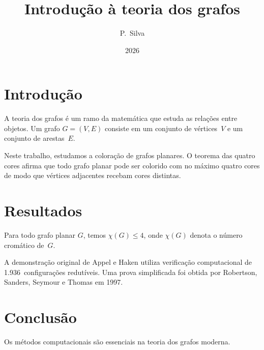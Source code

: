 \documentclass{article}
\title{Introdu\c{c}\~ao \`a teoria dos grafos}
\author{P.~Silva}
\date{2026}
\begin{document}
\maketitle

\section{Introdu\c{c}\~ao}

A teoria dos grafos \'e um ramo da matem\'atica que estuda as rela\c{c}\~oes
entre objetos.  Um grafo $G = (V, E)$ consiste em um conjunto de v\'ertices~$V$
e um conjunto de arestas~$E$.

Neste trabalho, estudamos a colora\c{c}\~ao de grafos planares.  O teorema das
quatro cores afirma que todo grafo planar pode ser colorido com no m\'aximo
quatro cores de modo que v\'ertices adjacentes recebam cores distintas.

\section{Resultados}

\begin{theorem}
Para todo grafo planar $G$, temos $\chi(G) \le 4$, onde $\chi(G)$ denota o
n\'umero crom\'atico de~$G$.
\end{theorem}

A demonstra\c{c}\~ao original de Appel e Haken utiliza verifica\c{c}\~ao
computacional de 1.936~configura\c{c}\~oes redut\'iveis.  Uma prova
simplificada foi obtida por Robertson, Sanders, Seymour e Thomas em 1997.

\section{Conclus\~ao}

Os m\'etodos computacionais s\~ao essenciais na teoria dos grafos moderna.
\end{document}
